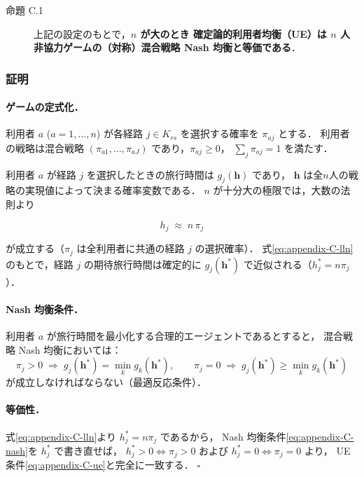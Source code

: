 \begin{description}
  \item[命題 C.1] 上記の設定のもとで，\textbf{$n$ が大のとき
    確定論的利用者均衡（UE）は $n$ 人非協力ゲームの（対称）混合戦略 Nash 均衡と等価である}．
\end{description}

\subsubsection*{証明}

\paragraph*{ゲームの定式化．}
利用者 $a$ ($a = 1, \ldots, n$) が各経路 $j \in K_{rs}$ を選択する確率を $\pi_{aj}$ とする．
利用者の戦略は混合戦略 $(\pi_{a1}, \ldots, \pi_{aJ})$ であり，$\pi_{aj} \geq 0$，
$\sum_j \pi_{aj} = 1$ を満たす．

利用者 $a$ が経路 $j$ を選択したときの旅行時間は $g_j(\boldsymbol{h})$ であり，
$\boldsymbol{h}$ は全$n$人の戦略の実現値によって決まる確率変数である．
$n$ が十分大の極限では，大数の法則より

\begin{equation}
  h_j \;\approx\; n\,\pi_j
  \label{eq:appendix-C-lln}
\end{equation}

が成立する（$\pi_j$ は全利用者に共通の経路 $j$ の選択確率）．
式\eqref{eq:appendix-C-lln} のもとで，経路 $j$ の期待旅行時間は確定的に
$g_j(\boldsymbol{h}^*)$ で近似される（$h_j^* = n\pi_j$）．

\paragraph*{Nash 均衡条件．}
利用者 $a$ が旅行時間を最小化する合理的エージェントであるとすると，
混合戦略 Nash 均衡においては：
\begin{equation}
  \pi_j > 0 \;\Rightarrow\; g_j(\boldsymbol{h}^*) = \min_k g_k(\boldsymbol{h}^*),
  \qquad
  \pi_j = 0 \;\Rightarrow\; g_j(\boldsymbol{h}^*) \geq \min_k g_k(\boldsymbol{h}^*)
  \label{eq:appendix-C-nash}
\end{equation}
が成立しなければならない（最適反応条件）．

\paragraph*{等価性．}
式\eqref{eq:appendix-C-lln}より $h_j^* = n\pi_j$ であるから，
Nash 均衡条件\eqref{eq:appendix-C-nash}を $h_j^*$ で書き直せば，
$h_j^* > 0 \Leftrightarrow \pi_j > 0$ および $h_j^* = 0 \Leftrightarrow \pi_j = 0$ より，
UE 条件\eqref{eq:appendix-C-ue}と完全に一致する．
\hfill$\square$

